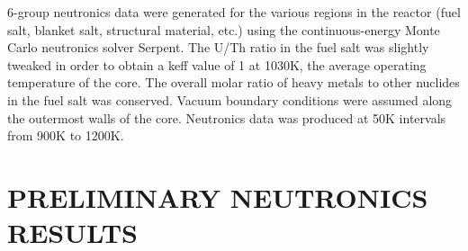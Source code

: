 \documentclass[letterpaper]{mandc2019}
\begin{document}
6-group neutronics data were generated for the various regions in the reactor (fuel salt, blanket salt, structural material, etc.) using the continuous-energy Monte Carlo neutronics solver Serpent. The U/Th ratio in the fuel salt was slightly tweaked in order to obtain a keff value of 1 at 1030K, the average operating temperature of the core. The overall molar ratio of heavy metals to other nuclides in the fuel salt was conserved. Vacuum boundary conditions were assumed along the outermost walls of the core. Neutronics data was produced at 50K intervals from 900K to 1200K.

\section{PRELIMINARY NEUTRONICS RESULTS}

\setlength{\baselineskip}{12pt}


\end{document}
